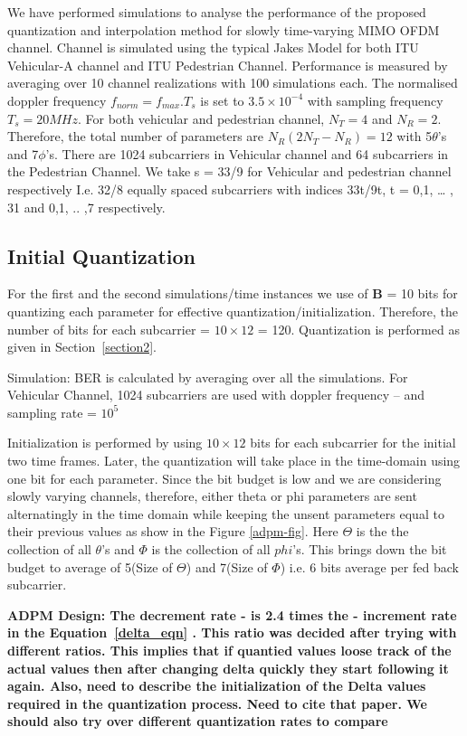 \documentclass[conference]{IEEEtran}
\begin{document}
 We have performed simulations to analyse the performance of the proposed quantization and interpolation method for slowly time-varying MIMO OFDM channel. Channel is simulated using the typical Jakes Model for both ITU Vehicular-A channel and ITU Pedestrian Channel. Performance is measured by averaging over 10 channel realizations with 100 simulations each. The normalised doppler frequency $f_{norm} = f_{max}.T_s$ is set to $3.5\times10^{-4}$ with sampling frequency $T_s = 20MHz$. For both vehicular and pedestrian channel, $N_T=4$ and $N_R=2$. Therefore, the total number of parameters are $N_{R}(2N_{T} - N_{R}) = 12$ with 5$\theta$’s and 7$\phi$’s. There are 1024 subcarriers in Vehicular channel and 64 subcarriers in the Pedestrian Channel. We take s = 33/9 for Vehicular and pedestrian channel respectively I.e. 32/8 equally spaced subcarriers with indices 33t/9t, t = 0,1, … , 31 and 0,1, .. ,7 respectively.

\subsection{Initial Quantization}
For the first and the second simulations/time instances we use of $\textbf{B}$ = 10 bits for quantizing each parameter for effective quantization/initialization. Therefore, the number of bits for each subcarrier = $10\times12$ = 120. Quantization is performed as given in Section~\ref{section2}.

Simulation: BER is calculated by averaging over all the simulations. For Vehicular Channel, 1024 subcarriers are used with doppler frequency – and sampling rate = $10^{5}$

Initialization is performed by using $10\times12$ bits for each subcarrier for the initial two time frames. Later, the quantization will take place in the time-domain using one bit for each parameter. Since the bit budget is low and we are considering slowly varying channels, therefore, either theta or phi parameters are sent alternatingly in the time domain while keeping the unsent parameters equal to their previous values as show in the Figure \ref{adpm-fig}. Here $\Theta$ is the the collection of all $\theta$'s and $\Phi$ is the collection of all $phi$'s. This brings down the bit budget to average of 5(Size of $\Theta$) and 7(Size of $\Phi$) i.e. 6 bits average per fed back subcarrier.

\bf{ADPM Design}: The decrement rate - \bm is 2.4 times the \bM - increment rate in the Equation~\ref{delta_eqn} . This ratio was decided after trying with different ratios. This implies that if quantied values loose track of the actual values then after changing delta quickly they start following it again.
Also, need to describe the initialization of the Delta values required in the quantization process. Need to cite that paper. We should also try over different quantization rates to compare
\end{document}

